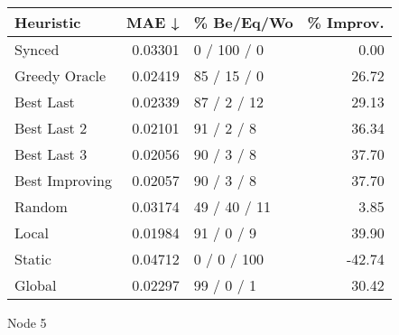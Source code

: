 \begin{tabular}{lrlr}
\toprule
\textbf{Heuristic} & \textbf{MAE ↓} & \textbf{\% Be/Eq/Wo} & \textbf{\% Improv.} \\
\midrule
            Synced &        0.03301 &          0 / 100 / 0 &                0.00 \\
     Greedy Oracle &        0.02419 &          85 / 15 / 0 &               26.72 \\
         Best Last &        0.02339 &          87 / 2 / 12 &               29.13 \\
       Best Last 2 &        0.02101 &           91 / 2 / 8 &               36.34 \\
       Best Last 3 &        0.02056 &           90 / 3 / 8 &               37.70 \\
    Best Improving &        0.02057 &           90 / 3 / 8 &               37.70 \\
            Random &        0.03174 &         49 / 40 / 11 &                3.85 \\
             Local &        0.01984 &           91 / 0 / 9 &               39.90 \\
            Static &        0.04712 &          0 / 0 / 100 &              -42.74 \\
            Global &        0.02297 &           99 / 0 / 1 &               30.42 \\
\bottomrule
\end{tabular}
\caption{Node 5}
\label{tab:non_lr01_le1_bs4_5}
